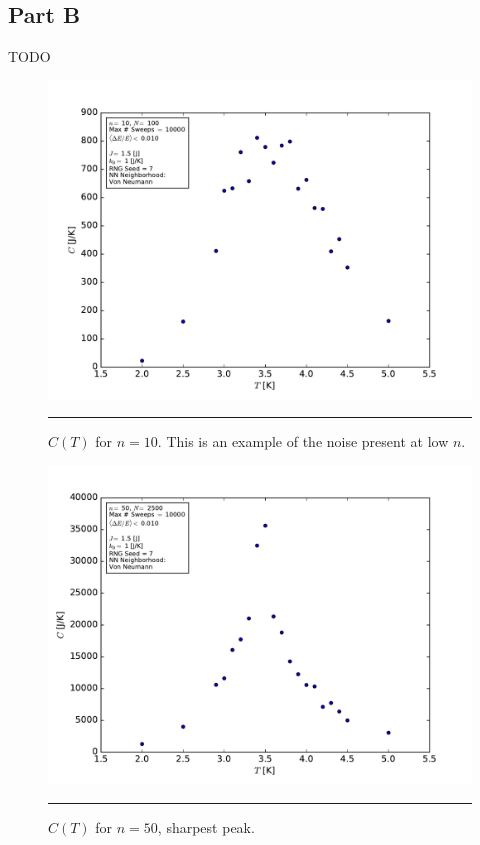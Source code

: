 \documentclass[notitlepage,aps,prd,nofootinbib]{revtex4-1}
\begin{document}
\clearpage

\subsection{Part B}
\label{subsec:results_part_b}
TODO


\begin{figure}[!htbc]
  \centering
  \includegraphics[width=.72\textwidth]{../output/plots_for_paper_von_neumann/part_b/CT_for_n10.pdf}
	{\par\nobreak\rule[9pt]{35em}{0.5pt}\vspace{-5mm}}
	\caption{$C\left(T\right)$ for $n=10$. This is an example of the noise present at low $n$.}
	\label{fig:CT_n10}
\end{figure}

\begin{figure}[!htbc]
  \centering
  \includegraphics[width=.72\textwidth]{../output/plots_for_paper_von_neumann/part_b/CT_for_n50.pdf}
	{\par\nobreak\rule[9pt]{35em}{0.5pt}\vspace{-5mm}}
	\caption{$C\left(T\right)$ for $n=50$, sharpest peak.}
	\label{fig:CT_n50}
\end{figure}
\end{document}
